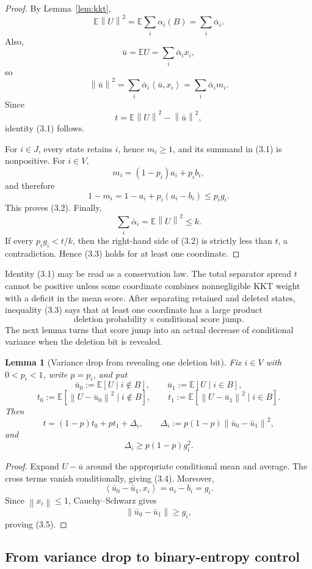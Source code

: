 \documentclass[11pt]{article}
\newtheorem{lemma}[theorem]{Lemma}
\theoremstyle{definition}
\theoremstyle{remark}
\newcommand{\E}{\mathbb E}
\newcommand{\ip}[2]{\left\langle #1,#2\right\rangle}
\newcommand{\norm}[1]{\left\lVert #1\right\rVert}
\begin{document}
\begin{proof}
By Lemma~\ref{lem:kkt},
\[
 \E\norm U^2
 =
 \E\sum_i\alpha_i(B)
 =
 \sum_i\bar\alpha_i.
\]
Also,
\[
 \bar u
 =
 \E U
 =
 \sum_i\bar\alpha_i x_i,
\]
so
\[
 \norm{\bar u}^2
 =
 \sum_i\bar\alpha_i\ip{\bar u}{x_i}
 =
 \sum_i\bar\alpha_i m_i.
\]
Since
\[
 t=\E\norm U^2-\norm{\bar u}^2,
\]
identity (3.1) follows.

For \(i\in J\), every state retains \(i\), hence \(m_i\ge1\), and its
summand in (3.1) is nonpositive. For \(i\in V\),
\[
 m_i=(1-p_i)a_i+p_i b_i,
\]
and therefore
\[
 1-m_i
 =
 1-a_i+p_i(a_i-b_i)
 \le
 p_i g_i.
\]
This proves (3.2). Finally,
\[
 \sum_i\bar\alpha_i
 =
 \E\norm U^2
 \le k.
\]
If every \(p_i g_i<t/k\), then the right-hand side of (3.2) is strictly less
than \(t\), a contradiction. Hence (3.3) holds for at least one coordinate.
\end{proof}

Identity (3.1) may be read as a conservation law. The total separator spread
\(t\) cannot be positive unless some coordinate combines nonnegligible KKT
weight with a deficit in the mean score. After separating retained and
deleted states, inequality (3.3) says that at least one coordinate has a
large product
\[
 \text{deletion probability}\times\text{conditional score jump}.
\]
The next lemma turns that score jump into an actual decrease of conditional
variance when the deletion bit is revealed.

\begin{lemma}[Variance drop from revealing one deletion bit]
\label{lem:variance-split}
Fix \(i\in V\) with \(0<p_i<1\), write \(p=p_i\), and put
\[
 \bar u_0:=\E[U\mid i\notin B],
 \qquad
 \bar u_1:=\E[U\mid i\in B],
\]
\[
 t_0:=
 \E[\norm{U-\bar u_0}^2\mid i\notin B],
 \qquad
 t_1:=
 \E[\norm{U-\bar u_1}^2\mid i\in B].
\]
Then
\[
 \boxed{
 t=(1-p)t_0+pt_1+\Delta_i,}
 \qquad
 \Delta_i:=
 p(1-p)\norm{\bar u_0-\bar u_1}^2,
 \tag{3.4}
\]
and
\[
 \boxed{
 \Delta_i\ge p(1-p)g_i^2.}
 \tag{3.5}
\]
\end{lemma}

\begin{proof}
Expand \(U-\bar u\) around the appropriate conditional mean and average.
The cross terms vanish conditionally, giving (3.4). Moreover,
\[
 \ip{\bar u_0-\bar u_1}{x_i}
 =
 a_i-b_i
 =
 g_i.
\]
Since \(\norm{x_i}\le1\), Cauchy--Schwarz gives
\[
 \norm{\bar u_0-\bar u_1}\ge g_i,
\]
proving (3.5).
\end{proof}

\subsection{From variance drop to binary-entropy control}
\end{document}

